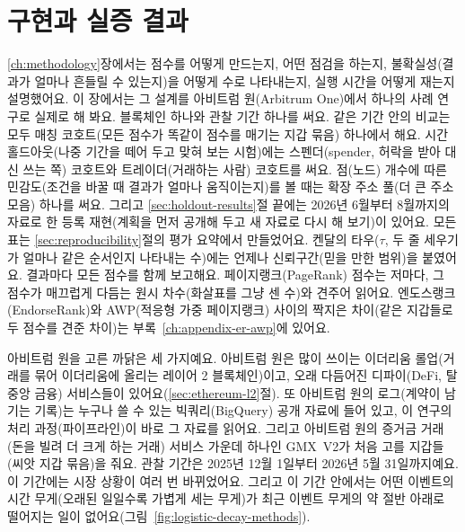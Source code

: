 \chapter{구현과 실증 결과}
\label{ch:results}

\ref{ch:methodology}장에서는 점수를 어떻게 만드는지, 어떤 점검을 하는지, 불확실성(결과가 얼마나 흔들릴 수 있는지)을 어떻게 수로 나타내는지, 실행 시간을 어떻게 재는지 설명했어요. 이 장에서는 그 설계를 아비트럼 원(Arbitrum One)에서 하나의 사례 연구로 실제로 해 봐요. 블록체인 하나와 관찰 기간 하나를 써요. 같은 기간 안의 비교는 모두 매칭 코호트(모든 점수가 똑같이 점수를 매기는 지갑 묶음) 하나에서 해요. 시간 홀드아웃(나중 기간을 떼어 두고 맞혀 보는 시험)에는 스펜더(spender, 허락을 받아 대신 쓰는 쪽) 코호트와 트레이더(거래하는 사람) 코호트를 써요. 점(노드) 개수에 따른 민감도(조건을 바꿀 때 결과가 얼마나 움직이는지)를 볼 때는 확장 주소 풀(더 큰 주소 모음) 하나를 써요. 그리고 \ref{sec:holdout-results}절 끝에는 2026년 6월부터 8월까지의 자료로 한 등록 재현(계획을 먼저 공개해 두고 새 자료로 다시 해 보기)이 있어요. 모든 표는 \ref{sec:reproducibility}절의 평가 요약에서 만들었어요. 켄달의 타우($\tau$, 두 줄 세우기가 얼마나 같은 순서인지 나타내는 수)에는 언제나 신뢰구간(믿을 만한 범위)을 붙였어요. 결과마다 모든 점수를 함께 보고해요. 페이지랭크(PageRank) 점수는 저마다, 그 점수가 매끄럽게 다듬는 원시 차수(화살표를 그냥 센 수)와 견주어 읽어요. 엔도스랭크(EndorseRank)와 AWP(적응형 가중 페이지랭크) 사이의 짝지은 차이(같은 지갑들로 두 점수를 견준 차이)는 부록~\ref{ch:appendix-er-awp}에 있어요.


아비트럼 원을 고른 까닭은 세 가지예요. 아비트럼 원은 많이 쓰이는 이더리움 롤업(거래를 묶어 이더리움에 올리는 레이어 2 블록체인)이고, 오래 다듬어진 디파이(DeFi, 탈중앙 금융) 서비스들이 있어요(\ref{sec:ethereum-l2}절). 또 아비트럼 원의 로그(계약이 남기는 기록)는 누구나 쓸 수 있는 빅쿼리(BigQuery) 공개 자료에 들어 있고, 이 연구의 처리 과정(파이프라인)이 바로 그 자료를 읽어요. 그리고 아비트럼 원의 증거금 거래(돈을 빌려 더 크게 하는 거래) 서비스 가운데 하나인 GMX~V2가 처음 고를 지갑들(씨앗 지갑 묶음)을 줘요. 관찰 기간은 2025년 12월 1일부터 2026년 5월 31일까지예요. 이 기간에는 시장 상황이 여러 번 바뀌었어요. 그리고 이 기간 안에서는 어떤 이벤트의 시간 무게(오래된 일일수록 가볍게 세는 무게)가 최근 이벤트 무게의 약 절반 아래로 떨어지는 일이 없어요(그림~\ref{fig:logistic-decay-methods}).


